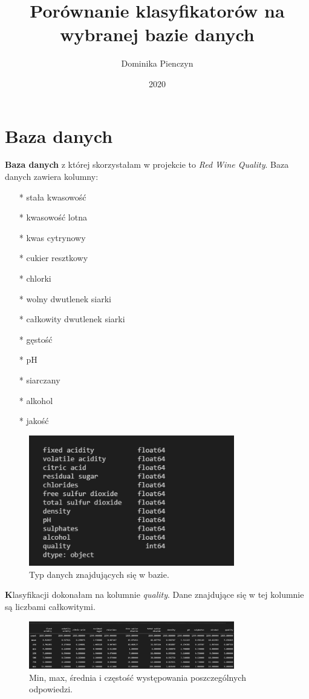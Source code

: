\documentclass{article}
\author   {Dominika Pienczyn}
\title    {Porównanie klasyfikatorów na wybranej bazie danych}
\date     {2020}
\begin{document}
\maketitle

\newpage
\section{Baza danych}
\textbf{Baza danych} z której skorzystałam w projekcie to \emph{Red Wine Quality}. Baza danych zawiera kolumny:
\begin{itemize}
\item[*] stała kwasowość
\item[*] kwasowość lotna
\item[*] kwas cytrynowy
\item[*] cukier resztkowy
\item[*] chlorki
\item[*] wolny dwutlenek siarki
\item[*] całkowity dwutlenek siarki
\item[*] gęstość
\item[*] pH
\item[*] siarczany
\item[*] alkohol
\item[*] jakość
\end{itemize}

\begin{figure}[!htb]
\centering
\includegraphics[width=0.8\textwidth]{image/type.png}
\caption{Typ danych znajdujących się w bazie.}
\end{figure}
\newpage
\textbf Klasyfikacji dokonałam na kolumnie \emph{quality}. Dane znajdujące się w tej kolumnie są liczbami całkowitymi.

\begin{figure}[!htb]
\centering
\includegraphics[width=0.8\textwidth]{image/mix.png}
\caption{Min, max, średnia i
częstość występowania poszczególnych odpowiedzi.}
\end{figure}
\end{document}
